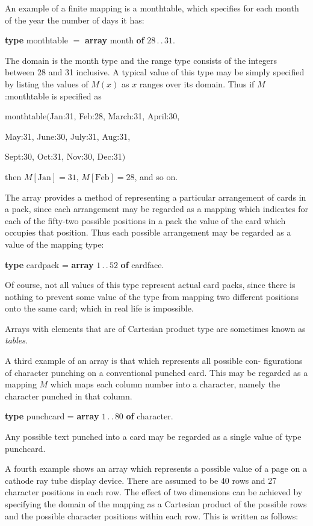 An example of a finite mapping is a monthtable, which specifies for each month of the year the number of days it has:

\quad \textbf{type} monthtable $=$ \textbf{array} month \textbf{of} $28\,.\,.\,31$.

\noindent
The domain is the month type and the range type consists of the integers between 28 and 31 inclusive. A typical value of this type may be simply specified by listing the values of $M(x)$ as $x$ ranges over its domain. Thus if $M$:monthtable is specified as

\quad monthtable$($Jan:31, Feb:28, March:31, April:30,

\quad May:31, June:30, July:31, Aug:31,

\quad Sept:30, Oct:31, Nov:30, Dec:31$)$

\noindent
then $M[\text{Jan}] = 31,\, M[\text{Feb}] = 28$, and so on.

The array provides a method of representing a particular arrangement of cards in a pack, since each arrangement may be regarded as a mapping which indicates for each of the fifty-two possible positions in a pack the value of the card which occupies that position. Thus each possible arrangement may be regarded as a value of the mapping type:

\quad \textbf{type} cardpack = \textbf{array} $1\,.\,.\,52$ \textbf{of} cardface.

\noindent
Of course, not all values of this type represent actual card packs, since there is nothing to prevent some value of the type from mapping two different positions onto the same card; which in real life is impossible.

Arrays with elements that are of Cartesian product type are sometimes known as \textit{tables}.

A third example of an array is that which represents all possible con- figurations of character punching on a conventional punched card. This may be regarded as a mapping $M$ which maps each column number into a character, namely the character punched in that column.

\quad \textbf{type} punchcard = \textbf{array} $1\,.\,.\,80$ \textbf{of} character.

\noindent
Any possible text punched into a card may be regarded as a single value of type punchcard.

A fourth example shows an array which represents a possible value of a page on a cathode ray tube display device. There are assumed to be 40 rows and 27 character positions in each row. The effect of two dimensions can be achieved by specifying the domain of the mapping as a Cartesian product of the possible rows and the possible character positions within each row. This is written as follows:

